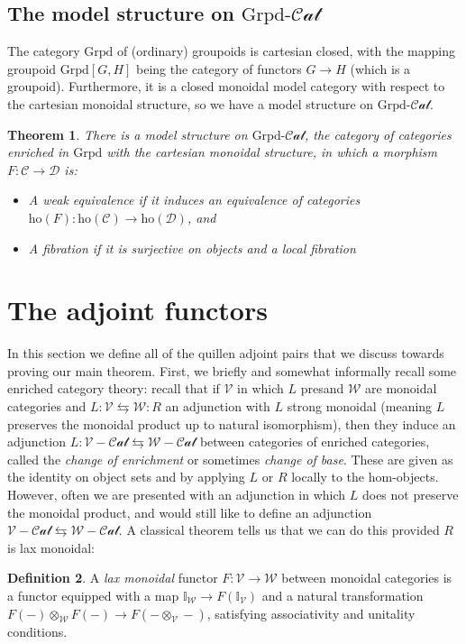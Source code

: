 \documentclass[12pt]{article}
\newtheorem{theorem}{Theorem}[section]
\theoremstyle{definition}
\newtheorem{definition}[theorem]{Definition}
\newcommand{\C}{\mathcal{C}}
\newcommand{\D}{\mathcal{D}}
\newcommand{\V}{\mathcal{V}}
\newcommand{\W}{\mathcal{W}}
\newcommand{\grpd}{\text{Grpd}}
\newcommand{\grpdcat}{\text{Grpd}\text{-}\mathcal{Cat}}
\newcommand{\ho}{\text{ho}}
\begin{document}
\subsection{The model structure on $\grpdcat$}
	 The category $\grpd$ of (ordinary) groupoids is cartesian closed, with the mapping groupoid $\grpd [G,H]$ being the category of functors $G \to H$ (which is a groupoid). Furthermore, it is a closed monoidal model category with respect to the cartesian monoidal structure, so we have a model structure on $\grpdcat$. 
	 \begin{theorem}
	 	There is a model structure on $\grpdcat$, the category of categories enriched in $\grpd$ with the cartesian monoidal structure, in which a morphism $F: \C \to \D$ is:
	 	\begin{itemize}
	 		\item A weak equivalence if it induces an equivalence of categories $\ho(F): \ho(\C) \to \ho(\D)$, and
	 		\item A fibration if it is surjective on objects and a local fibration
	 	\end{itemize}
	 \end{theorem}

\section{The adjoint functors}
	In this section we define all of the quillen adjoint pairs that we discuss towards proving our main theorem. First, we briefly and somewhat informally recall some enriched category theory: recall that if $\V$ in which $L$ presand $\W$ are monoidal categories and $L: \V \leftrightarrows \W: R$ an adjunction with $L$ strong monoidal (meaning $L$ preserves the monoidal product up to natural isomorphism), then they induce an adjunction $L: \V-\mathcal{Cat} \leftrightarrows  \W-\mathcal{Cat}$ between categories of enriched categories, called the \textit{change of enrichment} or sometimes \textit{change of base}. These are given as the identity on object sets and by applying $L$ or $R$ locally to the hom-objects. However, often we are presented with an adjunction in which $L$ does not preserve the monoidal product, and would still like to define an adjunction $\V-\mathcal{Cat} \leftrightarrows \W-\mathcal{Cat}$. A classical theorem tells us that we can do this provided $R$ is lax monoidal:
	\begin{definition}
		A \emph{lax monoidal} functor $F: \V \to \W$ between monoidal categories is a functor equipped with a map $\mathbb{I}_\W \to F(\mathbb{I}_\V)$ and a natural transformation $F(-) \otimes_\W F(-) \to F(- \otimes_\V -)$, satisfying associativity and unitality conditions.
	\end{definition}
	
\end{document}
